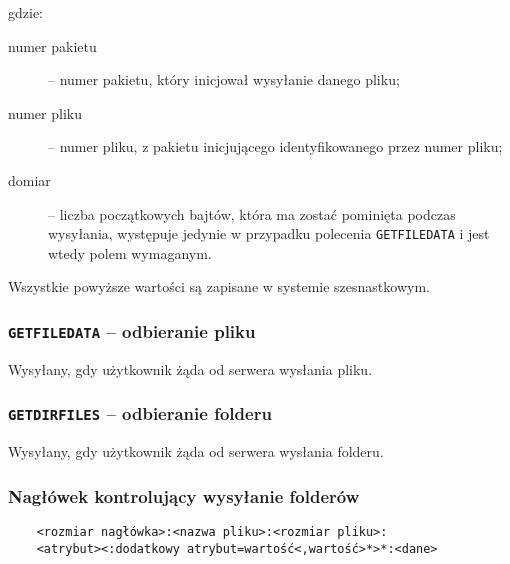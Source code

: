 \documentclass[11pt,leqno]{article}
\begin{document}
gdzie:
\begin{description}
	\item[numer pakietu] -- numer pakietu, który inicjował wysyłanie danego pliku;
	\item[numer pliku] -- numer pliku, z pakietu inicjującego identyfikowanego przez numer pliku;
	\item[domiar] -- liczba początkowych bajtów, która ma zostać pominięta podczas wysyłania,
	występuje jedynie w przypadku polecenia \texttt{GETFILEDATA} i jest wtedy polem wymaganym.
\end{description}
Wszystkie powyższe wartości są zapisane w systemie szesnastkowym.

\subsubsection{\textnormal{\texttt{GETFILEDATA}} -- odbieranie pliku}

Wysyłany, gdy użytkownik żąda od serwera wysłania pliku.

\subsubsection{\textnormal{\texttt{GETDIRFILES}} -- odbieranie folderu}

Wysyłany, gdy użytkownik żąda od serwera wysłania folderu.

\subsubsection{Nagłówek kontrolujący wysyłanie folderów}\label{sec:hierarchicalFileHeader}

\begin{verbatim}
	<rozmiar nagłówka>:<nazwa pliku>:<rozmiar pliku>:
	<atrybut><:dodatkowy atrybut=wartość<,wartość>*>*:<dane>
\end{verbatim}
\end{document}
